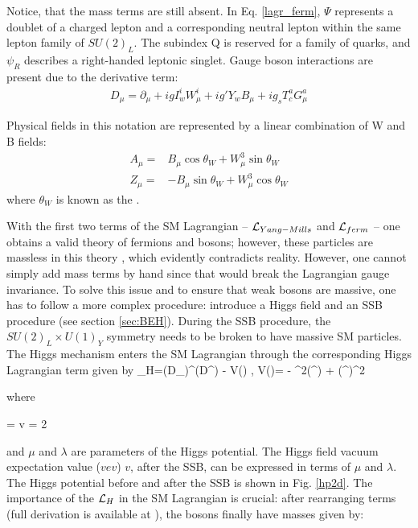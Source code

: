 \noindent Notice, that the mass terms are still absent. In Eq. \ref{lagr_ferm}, $\Psi$ represents a doublet of a charged lepton and a corresponding neutral lepton within the same lepton family of \textit{$SU(2)_L$}. The subindex Q is reserved for a family of quarks, and $\psi_R$ describes a right-handed leptonic singlet.  Gauge boson interactions are present due to the derivative term:
\begin{align}\label{cov_der2}
D_\mu = \partial_\mu + ig I_w^i W_\mu^i+ ig' Y_w B_\mu + ig_s T_c^a G_\mu^a
\end{align}

\noindent Physical fields in this notation are represented by a linear combination of W and B fields:
\begin{align}\label{neutral_fields}
A_\mu = &  B_\mu \cos\theta_W + W^3_\mu \sin\theta_W \\ 
Z_\mu = & -B_\mu \sin\theta_W + W^3_\mu \cos\theta_W \nonumber 
\end{align}
\noindent where $\theta_W$ is known as the  \cite{Weinberg:799984}.

With the first two terms of the SM Lagrangian --  $\mathcal{L}_{Yang-Mills}$ and $\mathcal{L}_{ferm}$ -- one obtains a valid theory of fermions and bosons; however, these particles are massless in this theory \cite{Wolf:2015kua}, which evidently contradicts reality. However, one cannot simply add mass terms by hand since that would break the Lagrangian gauge invariance. To solve this issue and to ensure that weak bosons are massive, one has to follow a more complex procedure: introduce a Higgs field and an SSB procedure (see section \ref{sec:BEH}). During the SSB procedure, the $SU(2)_L \times U(1)_Y$ symmetry needs to be broken to have massive SM particles. The Higgs mechanism enters the SM Lagrangian through the corresponding Higgs Lagrangian term given by 
\beqn\label{lagr_higgs}
\Lagr_H=(D_\mu\Phi)^\dagger(D^\mu\Phi) - V(\Phi) , \qquad V(\Phi)= - \mu^2(\Phi^\dagger\Phi) + (\Phi^\dagger\Phi)^2
\eeqn

\noindent where

\beqn\label{vev}
\Phi =  \quad {} \quad v = 2 
\eeqn

\noindent and $\mu$ and $\lambda$ are parameters of the Higgs potential. The Higgs field vacuum expectation value ($vev$) $v$, after the SSB, can be expressed in terms of $\mu$ and $\lambda$. The Higgs potential before and after the SSB is shown in Fig. \ref{hp2d}. The importance of the $\mathcal{L}_H$ in the SM Lagrangian is crucial: after rearranging terms (full derivation is available at \cite{Halzen:100339, Zee_qft}), the bosons finally have masses given by:

